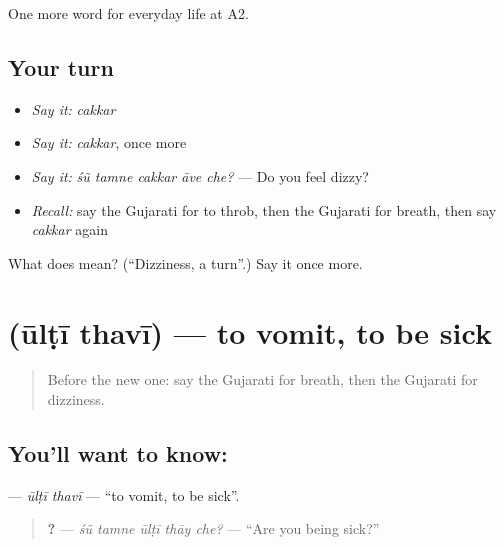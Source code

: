 \begin{grammarlens}[title={What you've built}]
One more word for everyday life at A2.
\end{grammarlens}

\subsection*{Your turn}
\begin{itemize}
\raggedright
  \item \emph{Say it:} \emph{cakkar}
  \item \emph{Say it:} \emph{cakkar}, once more
  \item \emph{Say it:} \emph{śũ tamne cakkar āve che?} — Do you feel dizzy?
  \item \emph{Recall:} say the Gujarati for to throb, then the Gujarati for breath, then say \emph{cakkar} again
\end{itemize}

\begin{tcolorbox}[breakable,colback=teal!4,colframe=teal!35!black,title={Before you move on}]
What does  mean? (\textquotedblleft{}Dizziness, a turn\textquotedblright{}.) Say it once more.
\end{tcolorbox}
\section[\texorpdfstring{\gu{ઊલટી} \gu{થવી} (ūlṭī thavī)}{ઊલટી થવી (ūlṭī thavī)}]{  (ūlṭī thavī) — to vomit, to be sick}

\label{lesson:GU-C225-ulti-thavi}



\begin{quote}
Before the new one: say the Gujarati for breath, then the Gujarati for dizziness.
\end{quote}

\subsection*{You'll want to know:  }
\textbf{ } — \emph{ūlṭī thavī} — \textquotedblleft{}to vomit, to be sick\textquotedblright{}.

\begin{quote}
\textbf{    ?} — \emph{śũ tamne ūlṭī thāy che?} — \textquotedblleft{}Are you being sick?\textquotedblright{}
\end{quote}

